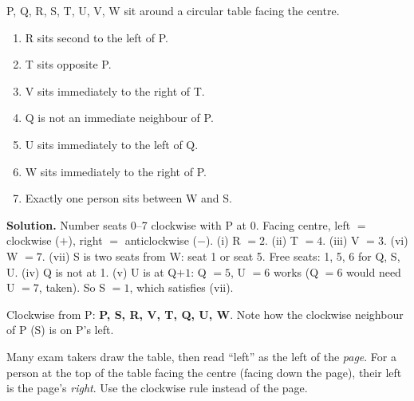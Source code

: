 \documentclass[11pt,a4paper,openany]{report}
\begin{document}
\begin{example}
P, Q, R, S, T, U, V, W sit around a circular table facing the centre.
\begin{enumerate}[nosep,label=(\roman*)]
\item R sits second to the left of P.
\item T sits opposite P.
\item V sits immediately to the right of T.
\item Q is not an immediate neighbour of P.
\item U sits immediately to the left of Q.
\item W sits immediately to the right of P.
\item Exactly one person sits between W and S.
\end{enumerate}

\textbf{Solution.} Number seats 0--7 clockwise with P at 0. Facing centre, left $=$ clockwise ($+$), right $=$ anticlockwise ($-$).
(i) R $=2$. (ii) T $=4$. (iii) V $=3$. (vi) W $=7$. (vii) S is two seats from W: seat 1 or seat 5.
Free seats: 1, 5, 6 for Q, S, U. (iv) Q is not at 1. (v) U is at Q$+1$: Q $=5$, U $=6$ works (Q $=6$ would need U $=7$, taken). So S $=1$, which satisfies (vii).
\begin{center}
\end{center}
Clockwise from P: \textbf{P, S, R, V, T, Q, U, W}. Note how the clockwise neighbour of P (S) is on P's left.
\end{example}

\begin{trap}
Many exam takers draw the table, then read ``left'' as the left of the \emph{page}. For a person at the top of the table facing
the centre (facing down the page), their left is the page's \emph{right}. Use the clockwise rule instead of the page.
\end{trap}
\end{document}
